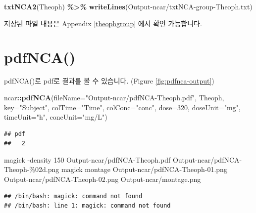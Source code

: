 \documentclass[
  12pt,
]{krantz}
\newenvironment{Shaded}{\begin{snugshade}}{\end{snugshade}}
\newcommand{\DataTypeTok}[1]{\textcolor[rgb]{0.13,0.29,0.53}{#1}}
\newcommand{\DecValTok}[1]{\textcolor[rgb]{0.00,0.00,0.81}{#1}}
\newcommand{\ExtensionTok}[1]{#1}
\newcommand{\KeywordTok}[1]{\textcolor[rgb]{0.13,0.29,0.53}{\textbf{#1}}}
\newcommand{\NormalTok}[1]{#1}
\newcommand{\OperatorTok}[1]{\textcolor[rgb]{0.81,0.36,0.00}{\textbf{#1}}}
\newcommand{\StringTok}[1]{\textcolor[rgb]{0.31,0.60,0.02}{#1}}
\begin{document}
\begin{Shaded}
\begin{Highlighting}[]
\KeywordTok{txtNCA2}\NormalTok{(Theoph) }\OperatorTok{\%\textgreater{}\%}\StringTok{ }\KeywordTok{writeLines}\NormalTok{(}\StringTok{\textquotesingle{}Output{-}ncar/txtNCA{-}group{-}Theoph.txt\textquotesingle{}}\NormalTok{)}
\end{Highlighting}
\end{Shaded}

저장된 파일 내용은 Appendix \ref{theophgroup} 에서 확인 가능합니다.

\hypertarget{pdfnca}{%
\section{pdfNCA()}\label{pdfnca}}

pdfNCA()로 pdf로 결과를 볼 수 있습니다. (Figure \ref{fig:pdfnca-output})

\begin{Shaded}
\begin{Highlighting}[]
\NormalTok{ncar}\OperatorTok{::}\KeywordTok{pdfNCA}\NormalTok{(}\DataTypeTok{fileName=}\StringTok{"Output{-}ncar/pdfNCA{-}Theoph.pdf"}\NormalTok{, Theoph, }\DataTypeTok{key=}\StringTok{"Subject"}\NormalTok{, }
             \DataTypeTok{colTime=}\StringTok{"Time"}\NormalTok{,  }\DataTypeTok{colConc=}\StringTok{"conc"}\NormalTok{, }\DataTypeTok{dose=}\DecValTok{320}\NormalTok{, }\DataTypeTok{doseUnit=}\StringTok{"mg"}\NormalTok{, }
             \DataTypeTok{timeUnit=}\StringTok{"h"}\NormalTok{, }\DataTypeTok{concUnit=}\StringTok{"mg/L"}\NormalTok{)}
\end{Highlighting}
\end{Shaded}

\begin{verbatim}
## pdf 
##   2
\end{verbatim}

\begin{Shaded}
\begin{Highlighting}[]
\ExtensionTok{magick}\NormalTok{ {-}density 150 Output{-}ncar/pdfNCA{-}Theoph.pdf Output{-}ncar/pdfNCA{-}Theoph{-}\%02d.png}
\ExtensionTok{magick}\NormalTok{ montage Output{-}ncar/pdfNCA{-}Theoph{-}01.png Output{-}ncar/pdfNCA{-}Theoph{-}02.png Output{-}ncar/montage.png}
\end{Highlighting}
\end{Shaded}

\begin{verbatim}
## /bin/bash: magick: command not found
## /bin/bash: line 1: magick: command not found
\end{verbatim}
\end{document}
